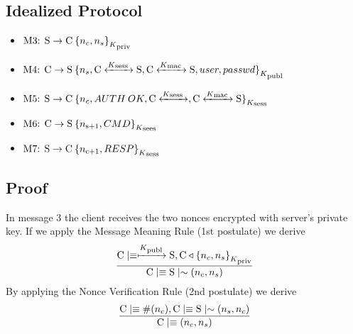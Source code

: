 \subsection{Idealized Protocol}
\begin{itemize}
	\item \(\textnormal{M3: S} \rightarrow \textnormal{C} \: { \{ n_c,n_s \} }_{K\textsubscript{priv}}\)
	\item \(\textnormal{M4: C} \rightarrow \textnormal{S} \: { \{ n_s,\textnormal{C} \xleftrightarrow{K\textsubscript{sess }} \textnormal{S},\textnormal{C} \xleftrightarrow{K\textsubscript{mac }} \textnormal{S},user,passwd \} }_{K\textsubscript{publ}}\)
	\item \(\textnormal{M5: S} \rightarrow \textnormal{C} \: { \{ n_c,AUTH\:OK, \textnormal{C} \xleftrightarrow{K\textsubscript{sess }},\textnormal{C} \xleftrightarrow{K\textsubscript{mac }} \textnormal{S} \} }_{K\textsubscript{sess}}\)
	\item \(\textnormal{M6: C} \rightarrow \textnormal{S} \: { \{ n\textsubscript{s+1},CMD \} }_{K\textsubscript{sees}}\)
	\item \(\textnormal{M7: S} \rightarrow \textnormal{C} \: { \{ n\textsubscript{c+1},RESP \} }_{K\textsubscript{sess}}\)
\end{itemize}

\subsection{Proof}
In message 3 the client receives the two nonces encrypted with server's private key. If we apply the Message Meaning Rule (1st postulate) we derive
\[ \frac{\textnormal{C} \mid\equiv \xmapsto{K\textsubscript{publ}} \textnormal{S}, \textnormal{C} \triangleleft { \{ n_c,n_s \} }_{K\textsubscript{priv}}}
        {\textnormal{C} \mid\equiv \textnormal{S} \mid\sim (n_c,n_s)}\]
By applying the Nonce Verification Rule (2nd postulate) we derive
\[ \frac{\textnormal{C} \mid\equiv \#(n_c), \textnormal{C} \mid\equiv \textnormal{S} \mid\sim (n_s,n_c)}{\textnormal{C} \mid\equiv (n_c,n_s)}\]

